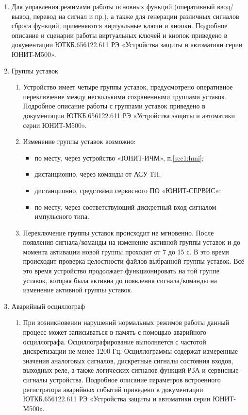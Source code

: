 \documentclass[a4paper, 12pt, table, hidelinks, DIV=calc]{extarticle}
\def\ManualUnitGeneral{ЮТКБ.656122.611 РЭ «Устройства защиты и автоматики серии ЮНИТ-М500»}
\begin{document}
\begin{enumerate}[label=\arabic{section}.\arabic{subsection}.\arabic*, labelsep=7pt, leftmargin=0pt, itemindent=60pt, align=left]
\item
Для управления режимами работы основных функций (оперативный ввод/вывод, перевод на сигнал и пр.), а также для генерации различных сигналов сброса функций, применяются виртуальные ключи и кнопки.
Подробное описание и сценарии работы виртуальных ключей и кнопок приведено в документации \ManualUnitGeneral. 

\item Группы уставок
\begin{enumerate}

\item Устройство имеет четыре группы уставок, предусмотрено оперативное переключение между несколькими сохраненными группами уставок. Подробное описание работы с группами уставок приведено в документации \ManualUnitGeneral.

\item
Изменение группы уставок возможно:
\begin{itemize}
    \item по месту, через устройство «ЮНИТ-ИЧМ», п.\ref{sec1:hmi};
    \item дистанционно, через команды от АСУ ТП;
    \item дистанционно, средствами сервисного ПО «ЮНИТ-СЕРВИС»;
    \item по месту, через соответствующий дискретный вход сигналом импульсного типа.
\end{itemize}

\item
Переключение группы уставок происходит не мгновенно.
После появления сигнала/команды на изменение активной группы уставок и до момента активации новой группы проходит от 7 до 15 с.
В это время происходит проверка целостности файлов выбранной группы уставок.
Всё это время устройство продолжает функционировать на той группе уставок, которая была активна до появления сигнала/команды на изменение активной группы уставок.

\end{enumerate}

\item Аварийный осциллограф
\begin{enumerate}
\item
При возникновении нарушений нормальных режимов работы данный процесс может записываться в память с помощью аварийного осциллографа.
Осциллографирование выполняется с частотой дискретизации не менее 1200 Гц.
Осциллограммы содержат измеренные значения аналоговых сигналов, дискретные сигналы состояния входов, выходных реле, а также логических сигналов функций РЗА и сервисные сигналы устройства.
Подробное описание параметров встроенного регистратора аварийных событий приведено в документации \ManualUnitGeneral.


\end{enumerate}
\end{enumerate}
\end{document}
